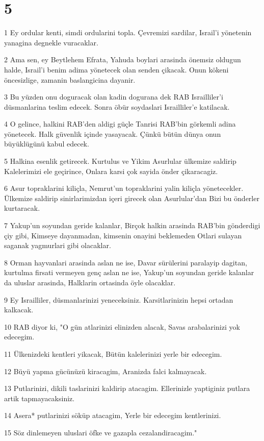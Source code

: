 \chapter{5}

\par 1 Ey ordular kenti, simdi ordularini topla. Çevremizi sardilar, Israil'i yönetenin yanagina degnekle vuracaklar.
\par 2 Ama sen, ey Beytlehem Efrata, Yahuda boylari arasinda önemsiz oldugun halde, Israil'i benim adima yönetecek olan senden çikacak. Onun kökeni öncesizlige, zamanin baslangicina dayanir.
\par 3 Bu yüzden onu doguracak olan kadin dogurana dek RAB Israilliler'i düsmanlarina teslim edecek. Sonra öbür soydaslari Israilliler'e katilacak.
\par 4 O gelince, halkini RAB'den aldigi güçle Tanrisi RAB'bin görkemli adina yönetecek. Halk güvenlik içinde yasayacak. Çünkü bütün dünya onun büyüklügünü kabul edecek.
\par 5 Halkina esenlik getirecek. Kurtulus ve Yikim Asurlular ülkemize saldirip Kalelerimizi ele geçirince, Onlara karsi çok sayida önder çikaracagiz.
\par 6 Asur topraklarini kiliçla, Nemrut'un topraklarini yalin kiliçla yönetecekler. Ülkemize saldirip sinirlarimizdan içeri girecek olan Asurlular'dan Bizi bu önderler kurtaracak.
\par 7 Yakup'un soyundan geride kalanlar, Birçok halkin arasinda RAB'bin gönderdigi çiy gibi, Kimseye dayanmadan, kimsenin onayini beklemeden Otlari sulayan saganak yagmurlari gibi olacaklar.
\par 8 Orman hayvanlari arasinda aslan ne ise, Davar sürülerini paralayip dagitan, kurtulma firsati vermeyen genç aslan ne ise, Yakup'un soyundan geride kalanlar da uluslar arasinda, Halklarin ortasinda öyle olacaklar.
\par 9 Ey Israilliler, düsmanlarinizi yeneceksiniz. Karsitlarinizin hepsi ortadan kalkacak.
\par 10 RAB diyor ki, "O gün atlarinizi elinizden alacak, Savas arabalarinizi yok edecegim.
\par 11 Ülkenizdeki kentleri yikacak, Bütün kalelerinizi yerle bir edecegim.
\par 12 Büyü yapma gücünüzü kiracagim, Aranizda falci kalmayacak.
\par 13 Putlarinizi, dikili taslarinizi kaldirip atacagim. Ellerinizle yaptiginiz putlara artik tapmayacaksiniz.
\par 14 Asera* putlarinizi söküp atacagim, Yerle bir edecegim kentlerinizi.
\par 15 Söz dinlemeyen uluslari öfke ve gazapla cezalandiracagim."

